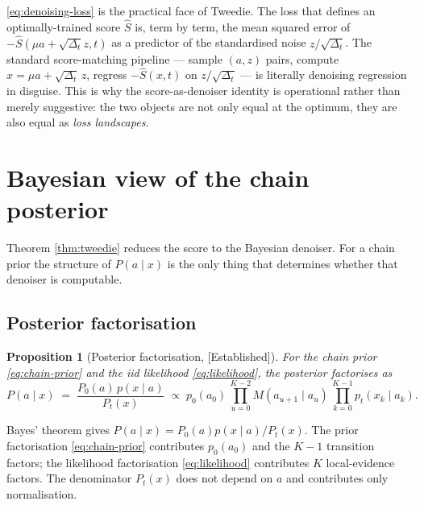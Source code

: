 \documentclass[11pt]{article}
\newtheorem{proposition}{Proposition}
\theoremstyle{definition}
\newcommand{\Detl}{\Delta_t}
\newcommand{\Established}{\textcolor{black!50!green}{\textsf{[Established]}}}
\begin{document}
\begin{intuition}
\eqref{eq:denoising-loss} is the practical face of Tweedie. The
loss that defines an optimally-trained score \(\widehat S\) is, term
by term, the mean squared error of \(-\widehat S(\mu a + \sqrt{\Detl}
z, t)\) as a predictor of the standardised noise
\(z / \sqrt{\Detl}\). The standard score-matching pipeline ---
sample \((a, z)\) pairs, compute \(x = \mu a + \sqrt{\Detl}\, z\),
regress \(-\widehat S(x, t)\) on \(z / \sqrt{\Detl}\) --- is
literally denoising regression in disguise. This is why the
score-as-denoiser identity is operational rather than merely
suggestive: the two objects are not only equal at the optimum, they
are also equal as \emph{loss landscapes}.
\end{intuition}

\section{Bayesian view of the chain posterior}\label{sec:bayesian}

Theorem \ref{thm:tweedie} reduces the score to the Bayesian denoiser.
For a chain prior the structure of \(P(a \mid x)\) is the only thing
that determines whether that denoiser is computable.

\subsection{Posterior factorisation}

\begin{proposition}[Posterior factorisation,
\Established]\label{prop:posterior-fact}
For the chain prior \eqref{eq:chain-prior} and the iid likelihood
\eqref{eq:likelihood}, the posterior factorises as
\begin{equation}\label{eq:posterior-fact}
    P(a \mid x)
        \;=\; \frac{P_0(a)\, p(x \mid a)}{P_t(x)}
        \;\propto\; p_0(a_0)\, \prod_{u=0}^{K-2} M(a_{u+1} \mid a_u)\,
                  \prod_{k=0}^{K-1} p_t(x_k \mid a_k).
\end{equation}
\end{proposition}

\begin{derivation}
Bayes' theorem gives \(P(a \mid x) = P_0(a) p(x \mid a) / P_t(x)\).
The prior factorisation \eqref{eq:chain-prior} contributes
\(p_0(a_0)\) and the \(K - 1\) transition factors; the likelihood
factorisation \eqref{eq:likelihood} contributes \(K\) local-evidence
factors. The denominator \(P_t(x)\) does not depend on \(a\) and
contributes only normalisation.
\end{derivation}
\end{document}
